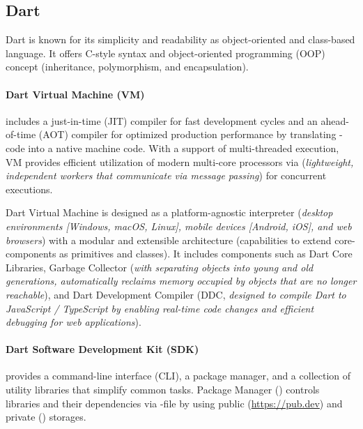 
\subsection{Dart}
 \label{dart}

Dart is known for its simplicity and readability as object-oriented and class-based language. It offers C-style syntax 
and object-oriented programming (OOP) concept (inheritance, polymorphism, and encapsulation).

\paragraph{Dart Virtual Machine (VM)} includes a just-in-time (JIT) compiler for fast development cycles and an 
ahead-of-time (AOT) compiler for optimized production performance by translating -code into a native machine 
code. With a support of multi-threaded execution, VM provides efficient utilization of modern multi-core processors via 
 (\emph{lightweight, independent workers that communicate via message passing}) for concurrent executions.

Dart Virtual Machine is designed as a platform-agnostic interpreter (\emph{desktop environments [Windows, macOS, Linux], 
mobile devices [Android, iOS], and web browsers}) with a modular and extensible architecture (capabilities to extend 
core-components as primitives and classes). It includes components such as Dart Core Libraries, Garbage Collector 
(\emph{with separating objects into young and old generations, automatically reclaims memory occupied by objects that 
are no longer reachable}), and Dart Development Compiler (DDC, \emph{designed to compile Dart to JavaScript / TypeScript 
by enabling real-time code changes and efficient debugging for web applications}).

\paragraph{Dart Software Development Kit (SDK)} provides a command-line interface (CLI), a package manager, 
and a collection of utility libraries that simplify common tasks. Package Manager () controls libraries and 
their dependencies via -file by using public (\href{https://pub.dev}{https://pub.dev}) and private 
() storages.


